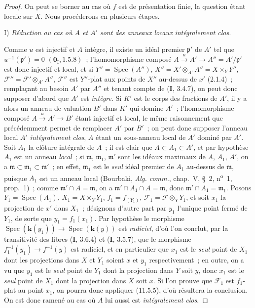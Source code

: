 \begin{proof}
On peut se borner au cas où $f$ est de présentation finie, la question étant
locale sur $X$. Nous procéderons en plusieurs étapes.

\medskip
\noindent I) \emph{Réduction au cas où $A$ et $A'$ sont des anneaux
locaux intégralement clos.}

Comme $u$ est injectif et $A$ intègre, il existe un idéal premier
$\mathfrak p'$ de $A'$ tel que $u^{-1}(\mathfrak p')=0$
$(\mathbf 0_{\mathrm I},1.5.8)$~; l'homomorphisme composé
$A\xrightarrow{u}A'\to A''=A'/\mathfrak p'$ est donc injectif et local, et si
$Y''=\operatorname{Spec}(A'')$, $X''=X'\otimes_{A'}A''=X\times_Y Y''$,
$\mathcal F''=\mathcal F'\otimes_{A'}A''$, $\mathcal F''$ est $Y''$-plat aux
points de $X''$ au-dessus de $x'$ (2.1.4)~; remplaçant au besoin $A'$ par $A''$
et tenant compte de (\textbf I, 3.4.7), on peut donc supposer d'abord que $A'$
est \emph{intègre}. Si $K'$ est le corps des fractions de $A'$, il y a alors un anneau
de valuation $B'$ dans $K'$ qui domine $A'$~; l'homomorphisme composé
$A\xrightarrow{u}A'\to B'$ étant injectif et local, le même raisonnement que
précédemment permet de remplacer $A'$ par $B'$~; on peut donc supposer l'anneau
local $A'$ \emph{intégralement clos}, $A$ étant un sous-anneau local de $A'$ dominé par
$A'$. Soit $A_1$ la clôture intégrale de $A$~; il est clair que
$A\subset A_1\subset A'$, et par hypothèse $A_1$ est un anneau \emph{local}~; si
$\mathfrak m$, $\mathfrak m_1$, $\mathfrak m'$ sont les idéaux maximaux de
$A$, $A_1$, $A'$, on a $\mathfrak m\subset\mathfrak m_1\subset\mathfrak m'$~;
en effet, $\mathfrak m_1$ est le \emph{seul} idéal premier de $A_1$ au-dessus de
$\mathfrak m$, puisque $A_1$ est un anneau local (Bourbaki,
\emph{Alg. comm.}, chap.~V, \S~2, n\textsuperscript{o}~1, prop.~1)~; comme
$\mathfrak m'\cap A=\mathfrak m$, on a
$\mathfrak m'\cap A_1\cap A=\mathfrak m$, donc
$\mathfrak m'\cap A_1=\mathfrak m_1$. Posons
$Y_1=\operatorname{Spec}(A_1)$, $X_1=X\times_Y Y_1$, $f_1=f_{(Y_1)}$,
$\mathcal F_1=\mathcal F\otimes_Y Y_1$, et soit $x_1$ la projection de $x'$ dans
$X_1$~; désignons d'autre part par $y_1$ l'unique point fermé de $Y_1$, de sorte
que $y_1=f_1(x_1)$. Par hypothèse le morphisme
$\operatorname{Spec}(\boldsymbol{k}(y_1))\to\operatorname{Spec}(\boldsymbol{k}(y))$ est \emph{radiciel}, d'où
l'on conclut, par la transitivité des fibres (\textbf I, 3.6.4) et
(\textbf I, 3.5.7), que le morphisme $f_1^{-1}(y_1)\to f^{-1}(y)$ est radiciel,
et en particulier que $x_1$ est le \emph{seul} point de $X_1$ dont les
projections dans $X$ et $Y_1$ soient $x$ et $y_1$ respectivement~; en outre, on
a vu que $y_1$ est le \emph{seul} point de $Y_1$ dont la projection dans $Y$ soit $y$,
donc $x_1$ est le \emph{seul} point de $X_1$ dont la projection dans $X$ soit $x$. Si
l'on prouve que $\mathcal F_1$ est $f_1$-plat au point $x_1$, on pourra donc
appliquer (11.5.5), d'où résultera la conclusion. On est donc ramené au cas où
$A$ lui aussi est \emph{intégralement clos}.


\end{proof}
